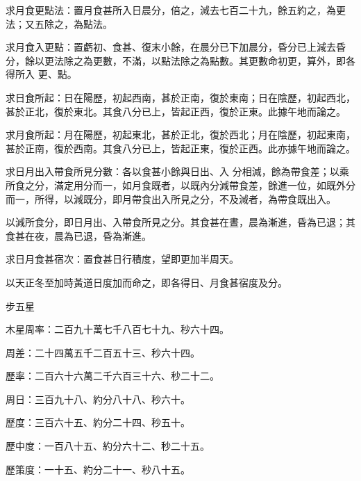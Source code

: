 \begin{pinyinscope}
 求月食更點法：置月食甚所入日晨分，倍之，減去七百二十九，餘五約之，為更法；又五除之，為點法。



 求月食入更點：置虧初、食甚、復末小餘，在晨分已下加晨分，昏分已上減去昏分，餘以更法除之為更數，不滿，以點法除之為點數。其更數命初更，算外，即各得所入
 更、點。



 求日食所起：日在陽歷，初起西南，甚於正南，復於東南；日在陰歷，初起西北，甚於正北，復於東北。其食八分已上，皆起正西，復於正東。此據午地而論之。



 求月食所起：月在陽歷，初起東北，甚於正北，復於西北；月在陰歷，初起東南，甚於正南，復於西南。其食八分已上，皆起正東，復於正西。此亦據午地而論之。



 求日月出入帶食所見分數：各以食甚小餘與日出、入
 分相減，餘為帶食差；以乘所食之分，滿定用分而一，如月食既者，以既內分減帶食差，餘進一位，如既外分而一，所得，以減既分，即月帶食出入所見之分，不及減者，為帶食既出入。



 以減所食分，即日月出、入帶食所見之分。其食甚在晝，晨為漸進，昏為已退；其食甚在夜，晨為已退，昏為漸進。



 求日月食甚宿次：置食甚日行積度，望即更加半周天。



 以天正冬至加時黃道日度加而命之，即各得日、月食甚宿度及分。



 步五星



 木星周率：二百九十萬七千八百七十九、秒六十四。



 周差：二十四萬五千二百五十三、秒六十四。



 歷率：二百六十六萬二千六百三十六、秒二十二。



 周日：三百九十八、約分八十八、秒六十。



 歷度：三百六十五、約分二十四、秒五十。



 歷中度：一百八十五、約分六十二、秒二十五。



 歷策度：一十五、約分二十一、秒八十五。




\end{pinyinscope}
